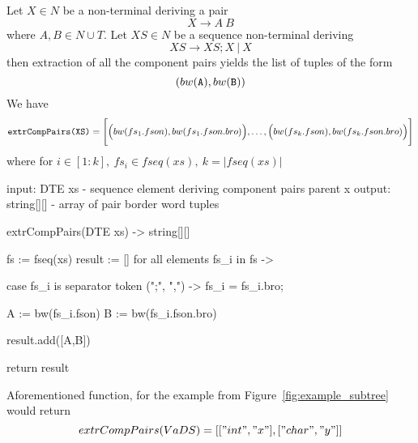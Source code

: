 \begin{definition}[extractCompPairs]
    Let $X \in N$ be a non-terminal deriving a pair
    \[X \to A\ B\]
    where $A,B \in N\cup T$.
    Let $XS \in N$ be a sequence non-terminal deriving
    \[ XS \to XS;X\ |\ X\]
    then extraction of all the component pairs yields the list of tuples of the form
    \[(bw(\verb+A+), bw(\verb+B+)) \]
    We have
    \[ \verb+extrCompPairs(XS)+ = \Bigg[ \Big( bw(fs_1.fson),bw(fs_1.fson.bro) \Big),\dots,\Big( bw(fs_k.fson),bw(fs_k.fson.bro) \Big) \Bigg]\]
    where for $i\in[1:k],\ fs_i \in fseq(xs),\ k=|fseq(xs)|$
\end{definition}
\begin{codeblock}
    input: DTE xs - sequence element deriving component pairs parent x
    output: string[][] - array of pair border word tuples

    extrCompPairs(DTE xs) -> string[][] {
        fs := fseq(xs)
        result := []
        for all elements fs_i in fs -> {
            case fs_i is separator token (";", ",") -> fs_i = fs_i.bro;

            A := bw(fs_i.fson)
            B := bw(fs_i.fson.bro)

            result.add([A,B])
        }
        return result
    }
\end{codeblock}
Aforementioned function, for the example from Figure~\ref{fig:example_subtree} would return
\[extrCompPairs(VaDS) = [["int", "x"], ["char", "y"]]\]


